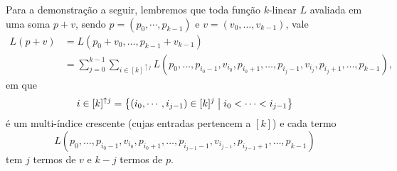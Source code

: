Para a demonstração a seguir, lembremos que toda função $k$-linear $L$ avaliada em uma soma $p+v$, sendo $p=(p_0,\cdots,p_{k-1})$ e $v=(v_0,\ldots,v_{k-1})$, vale
	\begin{align*}
	L(p+v) &= L(p_0+v_0,\ldots,p_{k-1}+v_{k-1}) \\
			&= \sum_{j=0}^{k-1} \sum_{i \in [k]^{\uparrow j}} L(p_0,\ldots,p_{i_0-1},v_{i_0},p_{i_0+1},\ldots,p_{i_j-1},v_{i_j},p_{i_j+1},\ldots,p_{k-1}),
	\end{align*}
em que
	\begin{equation*}
	i \in [k]^{\uparrow j} = \left\{{(i_0,\cdots,i_{j-1}) \in [k]^j}\;\middle\vert\;{i_0 < \cdots < i_{j-1}}\right\}
	\end{equation*}
é um multi-índice crescente (cujas entradas pertencem a $[k]$) e cada termo
	\begin{equation*}
	L(p_0,\ldots,p_{i_0-1},v_{i_0},p_{i_0+1},\ldots,p_{i_{j-1}-1},v_{i_{j-1}},p_{i_{j-1}+1},\ldots,p_{k-1})
	\end{equation*}
tem $j$ termos de $v$ e $k-j$ termos de $p$.

